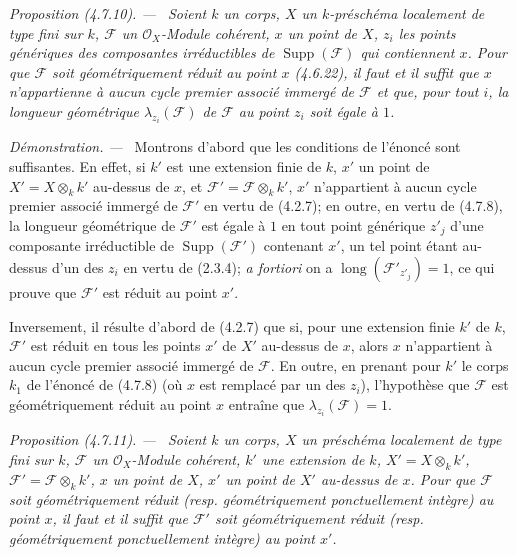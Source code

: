 \documentclass[10pt,oneside]{book}
\newenvironment{proposition}[1][]{%
  \par\medskip\noindent\itshape Proposition (#1). ---\ }{\par}
\newenvironment{proof}{%
  \par\medskip\noindent\textit{Démonstration. ---\ }}{\par}
\begin{document}
\begin{proposition}[4.7.10]
\label{IV.2.4.7.10-fr}
Soient $k$ un corps, $X$ un $k$-préschéma localement de type fini sur $k$,
$\mathscr F$ un $\mathcal O_X$-Module cohérent, $x$ un point de $X$, $z_i$
les points génériques des composantes irréductibles de
$\operatorname{Supp}(\mathscr F)$ qui contiennent $x$. Pour que $\mathscr F$
soit géométriquement réduit au point $x$ (4.6.22), il faut et il suffit que
$x$ n'appartienne à aucun cycle premier associé immergé de $\mathscr F$ et
que, pour tout $i$, la longueur géométrique $\lambda_{z_i}(\mathscr F)$ de
$\mathscr F$ au point $z_i$ soit égale à $1$.
\end{proposition}

\begin{proof}
Montrons d'abord que les conditions de l'énoncé sont suffisantes. En effet, si
$k'$ est une extension finie de $k$, $x'$ un point de
$X'=X\otimes_k k'$ au-dessus de $x$, et
$\mathscr F'=\mathscr F\otimes_k k'$, $x'$ n'appartient à aucun cycle premier
associé immergé de $\mathscr F'$ en vertu de (4.2.7); en outre, en vertu de
(4.7.8), la longueur géométrique de $\mathscr F'$ est égale à $1$ en tout
point générique $z'_j$ d'une composante irréductible de
$\operatorname{Supp}(\mathscr F')$ contenant $x'$, un tel point étant
au-dessus d'un des $z_i$ en vertu de (2.3.4); \emph{a fortiori} on a
$\operatorname{long}(\mathscr F'_{z'_j})=1$, ce qui prouve que $\mathscr F'$
est réduit au point $x'$.

Inversement, il résulte d'abord de (4.2.7) que si, pour une extension finie
$k'$ de $k$, $\mathscr F'$ est réduit en tous les points $x'$ de $X'$
au-dessus de $x$, alors $x$ n'appartient à aucun cycle premier associé immergé
de $\mathscr F$. En outre, en prenant pour $k'$ le corps $k_1$ de l'énoncé de
(4.7.8) (où $x$ est remplacé par un des $z_i$), l'hypothèse que $\mathscr F$
est géométriquement réduit au point $x$ entraîne que
$\lambda_{z_i}(\mathscr F)=1$.
\end{proof}

\begin{proposition}[4.7.11]
\label{IV.2.4.7.11-fr}
Soient $k$ un corps, $X$ un préschéma localement de type fini sur $k$,
$\mathscr F$ un $\mathcal O_X$-Module cohérent, $k'$ une extension de $k$,
$X'=X\otimes_k k'$, $\mathscr F'=\mathscr F\otimes_k k'$, $x$ un point de
$X$, $x'$ un point de $X'$ au-dessus de $x$. Pour que $\mathscr F$ soit
géométriquement réduit (resp. géométriquement ponctuellement intègre) au point
$x$, il faut et il suffit que $\mathscr F'$ soit géométriquement réduit (resp.
géométriquement ponctuellement intègre) au point $x'$.
\end{proposition}
\end{document}
